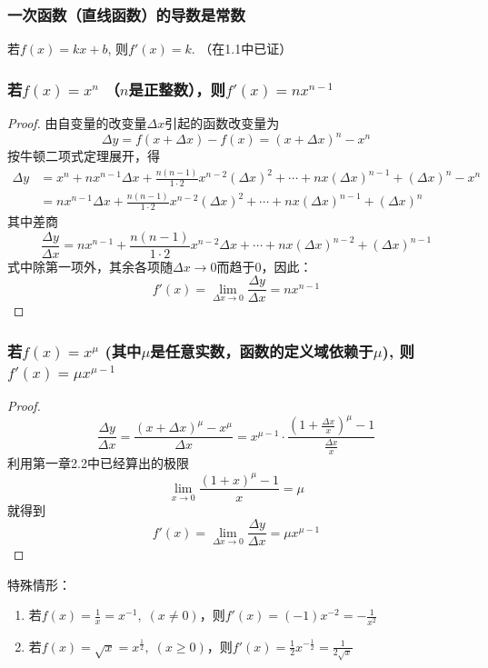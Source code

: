 \subsubsection{一次函数（直线函数）的导数是常数}

若$f(x)=kx+b$, 则$f'(x)=k$. （在1.1中已证）

\subsubsection{若$f(x)=x^n$ （$n$是正整数），则$f'(x)=nx^{n-1}$}

\begin{proof}
  由自变量的改变量$\Delta x$引起的函数改变量为
\[\Delta y=f (x+\Delta x) -f (x) = (x+\Delta x)^n-x^n\] 
按牛顿二项式定理展开，得  
\begin{align*}
\Delta y&= x^n+nx^{n-1}\Delta x+\frac{n(n-1)}{1\cdot 2}x^{n-2}(\Delta x)^2+\cdots+nx(\Delta x)^{n-1}+(\Delta x)^n-x^n\\
&=nx^{n-1}\Delta x+\frac{n(n-1)}{1\cdot 2}x^{n-2}(\Delta x)^2+\cdots+nx(\Delta x)^{n-1}+(\Delta x)^n
\end{align*}
其中差商
\[\frac{\Delta y}{\Delta x}=nx^{n-1}+\frac{n(n-1)}{1\cdot 2}x^{n-2}\Delta x+\cdots+nx(\Delta x)^{n-2}+(\Delta x)^{n-1}\]
式中除第一项外，其余各项随$\Delta x\to 0$而趋于0，因此：
\[f'(x)=\lim_{\Delta x\to 0}\frac{\Delta y}{\Delta x}=nx^{n-1}\]
\end{proof}

\subsubsection{若$f(x)=x^{\mu}$ (其中$\mu$是任意实数，函数的定义域依赖于$\mu$), 则$f'(x)=\mu x^{\mu-1}$}

\begin{proof}
    \[\frac{\Delta y}{\Delta x}=\frac{(x+\Delta x)^{\mu}-x^{\mu}}{\Delta x}=x^{\mu-1}\cdot \frac{\left(1+\frac{\Delta x}{x}\right)^{\mu}-1}{\frac{\Delta x}{x}}\]
利用第一章2.2中已经算出的极限
\[\lim_{x\to 0}\frac{(1+x)^{\mu}-1}{x}=\mu\]
就得到
\[f'(x)=\lim_{\Delta x\to 0}\frac{\Delta y}{\Delta x}=\mu x^{\mu-1}\]
\end{proof}

特殊情形：
\begin{enumerate}
    \item 若$f(x)=\frac{1}{x}=x^{-1},\; (x\ne 0)$，则$f'(x)=(-1)x^{-2}=-\frac{1}{x^2}$
    \item 若$f(x)=\sqrt{x}=x^{\tfrac{1}{2}},\; (x\ge 0)$，则$f'(x)=\frac{1}{2}x^{-\tfrac{1}{2}}=\frac{1}{2\sqrt{x}}$
\end{enumerate}

